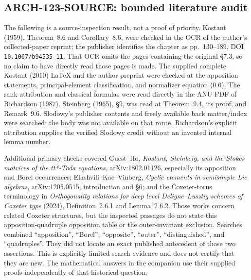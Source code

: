 \subsection{ARCH-123-SOURCE: bounded literature audit}
The following is a source-inspection result, not a proof of priority.
Kostant (1959), Theorem~8.6 and Corollary~8.6, were checked in the
OCR of the author's collected-paper reprint; the publisher identifies
the chapter as pp.~130--189, DOI \texttt{10.1007/b94535\_11}.
That OCR omits the pages containing the original \S7.3, so no claim
to have directly read those pages is made.  The supplied complete
Kostant (2010) LaTeX and the author preprint were checked at the
apposition statements, principal-element classification, and
normalizer equation (0.6).  The rank attribution and classical
formulas were read directly in the ANU PDF of Richardson (1987).
Steinberg (1965), \S9, was read at Theorem~9.4, its proof, and
Remark~9.6.  Slodowy's publisher contents and freely available
back matter/index were searched; the body was not available on
that route.  Richardson's explicit attribution supplies the
verified Slodowy credit without an invented internal lemma number.

Additional primary checks covered Guest--Ho,
\emph{Kostant, Steinberg, and the Stokes matrices of the tt*-Toda
equations}, arXiv:1802.01126, especially its apposition and Borel
occurrences; Elashvili--Kac--Vinberg,
\emph{Cyclic elements in semisimple Lie algebras},
arXiv:1205.0515, introduction and \S6; and the Coxeter-torus
terminology in \emph{Orthogonality relations for deep level
Deligne--Lusztig schemes of Coxeter type} (2024),
Definition~2.6.1 and Lemma~2.6.2.  Those works concern related
Coxeter structures, but the inspected passages do not state this
apposition-quadruple opposition table or the outer-invariant
exclusion.  Searches combined ``apposition'', ``Borel'',
``opposite'', ``outer'', ``distinguished'', and ``quadruples''.
They did not locate an exact published antecedent of those two
assertions.  This is explicitly limited search evidence and does
not certify that they are new.  The mathematical answers in the
companion use their supplied proofs independently of that historical
question.
